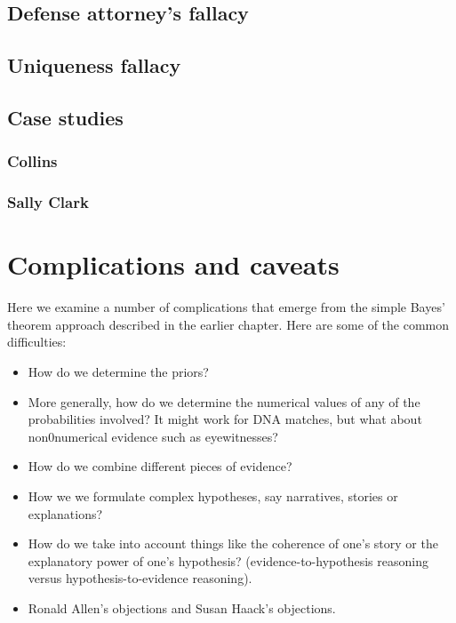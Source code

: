 \documentclass[]{book}
\begin{document}
\section{Defense attorney's fallacy}

\section{Uniqueness fallacy}

\section{Case studies}

\subsection{Collins}

\subsection{Sally Clark}

\chapter{Complications and caveats}


Here we examine a number of complications that emerge from the simple
Bayes' theorem approach described in the earlier chapter. Here are some
of the common difficulties:

\begin{itemize}
 
 \item How do we determine the priors?
 
 \item More generally, how do we determine the numerical 
 values of any of the probabilities involved? 
 It might work for DNA matches, but what about non0numerical evidence 
 such as eyewitnesses? 
 
 \item How do we combine different pieces of evidence?  
 
 \item How we we formulate complex hypotheses, 
 say narratives, stories or explanations? 
 
 \item How do we take into account things 
 like the coherence of one's story or 
 the explanatory power of one's hypothesis?
 (evidence-to-hypothesis reasoning 
 versus hypothesis-to-evidence reasoning).
 
 \item Ronald Allen's objections 
 and Susan Haack's objections. 
 
 \end{itemize}
\end{document}

